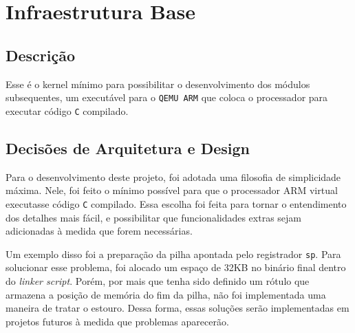 \chapter{Infraestrutura Base}


\section{Descrição}
%

Esse é o kernel mínimo para possibilitar o desenvolvimento dos módulos subsequentes, um executável para o \verb|QEMU ARM| que coloca o processador para executar código \verb|C| compilado.

\section{Decisões de Arquitetura e Design}
%
%

Para o desenvolvimento deste projeto, foi adotada uma filosofia de simplicidade máxima. Nele, foi feito o mínimo possível para que o processador ARM virtual executasse código \verb|C| compilado. Essa escolha foi feita para tornar o entendimento dos detalhes mais fácil, e possibilitar que funcionalidades extras sejam adicionadas à medida que forem necessárias.

Um exemplo disso foi a preparação da pilha apontada pelo registrador \verb|sp|. Para solucionar esse problema, foi alocado um espaço de 32KB no binário final dentro do \textit{linker script}. Porém, por mais que tenha sido definido um rótulo que armazena a posição de memória do fim da pilha, não foi implementada uma maneira de tratar o estouro. Dessa forma, essas soluções serão implementadas em projetos futuros à medida que problemas aparecerão.

